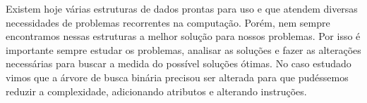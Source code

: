 \documentclass[
	article,			%
	12pt,				%
	oneside,			%
	a4paper,			%
	english,			%
	brazil,				%
	]{abntex2}
\begin{document}
Existem hoje várias estruturas de dados prontas para uso e que atendem diversas
necessidades de problemas recorrentes na computação. Porém, nem sempre 
encontramos nessas estruturas a melhor solução para nossos problemas. Por isso é
importante sempre estudar os problemas, analisar as soluções e fazer as 
alterações necessárias para buscar a medida do possível soluções ótimas.
No caso estudado vimos que a árvore de busca binária precisou ser alterada para 
que pudéssemos reduzir a complexidade, adicionando atributos e alterando 
instruções.
 
 
 

\pagebreak
\postextual

\nocite{book:339441, book:562370, jayme}



%
%
\end{document}

